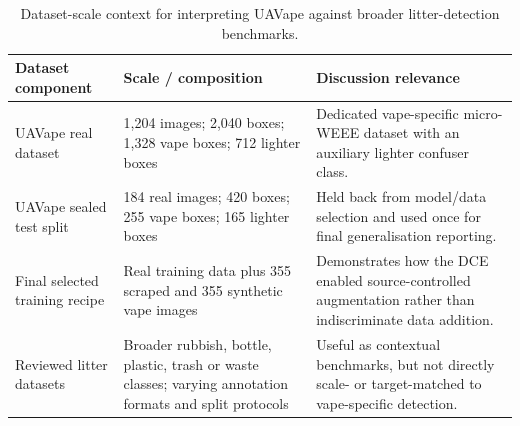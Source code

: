 \begin{table}[H]
\centering
\small
\begin{tabularx}{\textwidth}{p{} p{} X}
\toprule
\textbf{Dataset component} & \textbf{Scale / composition} & \textbf{Discussion relevance} \\
\midrule
UAVape real dataset & 1,204 images; 2,040 boxes; 1,328 vape boxes; 712 lighter boxes & Dedicated vape-specific micro-WEEE dataset with an auxiliary lighter confuser class. \\
UAVape sealed test split & 184 real images; 420 boxes; 255 vape boxes; 165 lighter boxes & Held back from model/data selection and used once for final generalisation reporting. \\
Final selected training recipe & Real training data plus 355 scraped and 355 synthetic vape images & Demonstrates how the DCE enabled source-controlled augmentation rather than indiscriminate data addition. \\
Reviewed litter datasets & Broader rubbish, bottle, plastic, trash or waste classes; varying annotation formats and split protocols & Useful as contextual benchmarks, but not directly scale- or target-matched to vape-specific detection. \\
\bottomrule
\end{tabularx}
\caption{Dataset-scale context for interpreting UAVape against broader litter-detection benchmarks.}
\label{tab:discussion_dataset_context}
\end{table}


